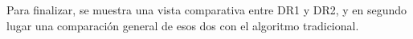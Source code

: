 \documentclass[12pt]{report}
\begin{document}
  Para finalizar, se muestra una vista comparativa entre DR1 y DR2, y en segundo lugar una comparación general de esos dos con el algoritmo tradicional.

  \centering
    
  \centering
\end{document}
